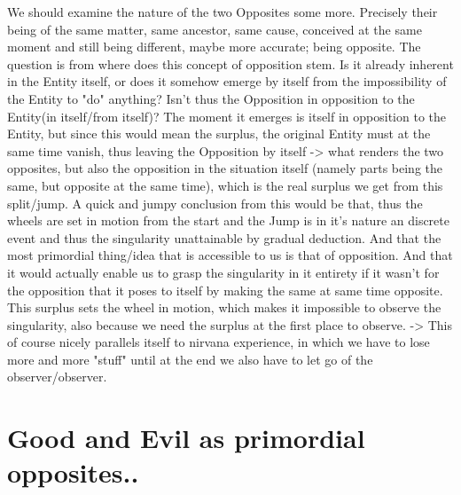 \documentclass[10pt]{book}
\begin{document}
We should examine the nature of the two Opposites some more. Precisely their being of the same matter, same ancestor, same cause, conceived at the same moment and still being different, maybe more accurate; being opposite. The question is from where does this concept of opposition stem. Is it already inherent in the Entity itself, or does it somehow emerge by itself from the impossibility of the Entity to "do" anything? Isn't thus the Opposition in opposition to the Entity(in itself/from itself)? The moment it emerges is itself in opposition to the Entity, but since this would mean the surplus, the original Entity must at the same time vanish, thus leaving the Opposition by itself -> what renders the two opposites, but also the opposition in the situation itself (namely parts being the same, but opposite at the same time), which is the real surplus we get from this split/jump. 
A quick and jumpy conclusion from this would be that, thus the wheels are set in motion from the start and the Jump is in it's nature an discrete event and thus the singularity unattainable by gradual deduction. And that the most primordial thing/idea that is accessible to us is that of opposition. And that it would actually enable us to grasp the singularity in it entirety if it wasn't for the opposition that it poses to itself by making the same at same time opposite. This surplus sets the wheel in motion, which makes it impossible to observe the singularity, also because we need the surplus at the first place to observe. -> This of course nicely parallels itself to nirvana experience, in which we have to lose more and more "stuff" until at the end we also have to let go of the observer/observer.


\section{Good and Evil as primordial opposites..}
\end{document}
